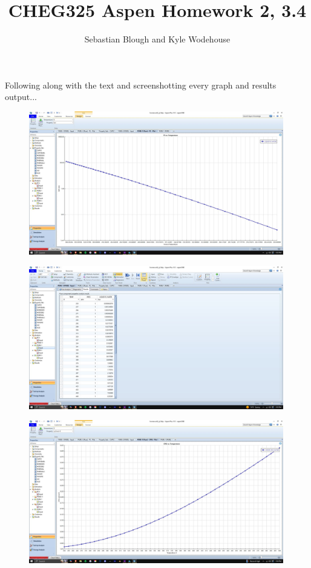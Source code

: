 \documentclass{article}
\title{\bfseries CHEG325 Aspen Homework 2, 3.4}
\author{Sebastian Blough and Kyle Wodehouse}
\date{}
\begin{document}
\maketitle
\noindent
Following along with the text and screenshotting every graph and results output...

\begin{figure}[H]
    \centering
    \includegraphics[width=0.99\textwidth, frame]{img/1 (PL).JPG}
\end{figure}

\begin{figure}[H]
    \centering
    \includegraphics[width=0.99\textwidth, frame]{img/2 (PL results).JPG}
\end{figure}

\begin{figure}[H]
    \centering
    \includegraphics[width=0.99\textwidth, frame]{img/3 (CPIG).JPG}
\end{figure}
\end{document}
